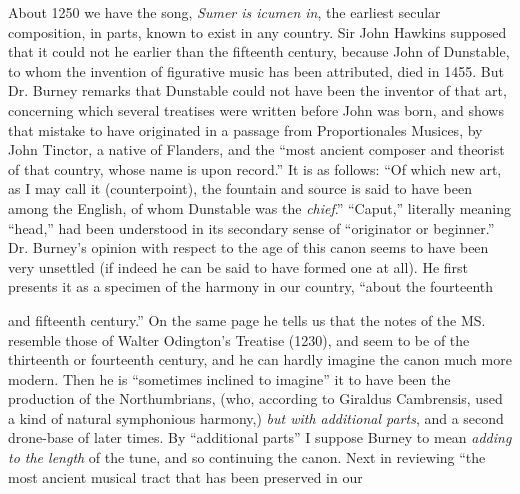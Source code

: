 About 1250 we have the song, \textit{Sumer is icumen in}, the earliest secular composition, 
in parts, known to exist in any country. Sir John Hawkins supposed that
it could not he earlier than the fifteenth century, because John of Dunstable, to
whom the invention of figurative music has been attributed, died in 1455. But
Dr. Burney remarks that Dunstable could not have been the inventor of that art,
concerning which several treatises were written before John was born, and shows
that mistake to have originated in a passage from Proportionales Musices, by John
Tinctor, a native of Flanders, and the “most ancient composer and theorist of
that country, whose name is upon record.” It is as follows: “Of which new art,
as I may call it (counterpoint), the fountain and source is said to have been among
the English, of whom Dunstable was the \textit{chief}.” “Caput,” literally meaning
“head,” had been understood in its secondary sense of “originator or beginner.”
Dr. Burney’s opinion with respect to the age of this canon seems to have been
very unsettled (if indeed he can be said to have formed one at all). He first
presents it as a specimen of the harmony \pagebreak 
in our country, “about the fourteenth 
and fifteenth century.” On the same page he tells us that the notes of the 
MS. resemble those of Walter Odington’s Treatise (1230), and seem to be of the
thirteenth or fourteenth century, and he can hardly imagine the canon much
more modern. Then he is “sometimes inclined to imagine” it to have been
the production of the Northumbrians, (who, according to Giraldus Cambrensis,
used a kind of natural symphonious harmony,) \textit{but with additional parts}, and a
second drone-base of later times. By “additional parts” I suppose Burney
to mean \textit{adding to the length} of the tune, and so continuing the canon. Next
in reviewing “the most ancient musical tract that has been preserved in our
